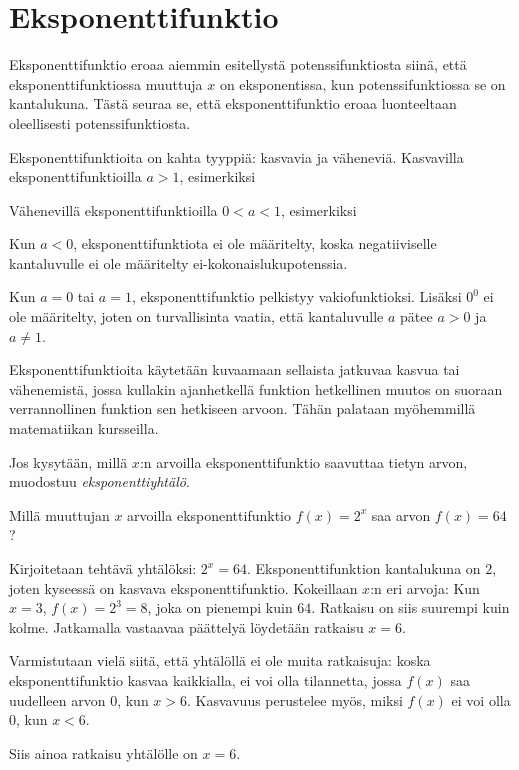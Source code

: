 \chapter{Eksponenttifunktio}


Eksponenttifunktio eroaa aiemmin esitellystä potenssifunktiosta siinä, että
eksponenttifunktiossa muuttuja $x$ on eksponentissa, kun potenssifunktiossa
se on kantalukuna. Tästä seuraa se, että eksponenttifunktio eroaa luonteeltaan
oleellisesti potenssifunktiosta.

Eksponenttifunktioita on kahta tyyppiä: kasvavia ja väheneviä.
Kasvavilla eksponenttifunktioilla $a>1$, esimerkiksi


Vähenevillä eksponenttifunktioilla $0<a<1$, esimerkiksi


Kun $a<0$, eksponenttifunktiota ei ole määritelty, koska negatiiviselle
kantaluvulle ei ole määritelty ei-kokonaislukupotenssia.

Kun $a=0$ tai $a=1$, eksponenttifunktio pelkistyy vakiofunktioksi.
Lisäksi $0^0$ ei ole määritelty, joten on turvallisinta vaatia, että
kantaluvulle $a$ pätee $a>0$ ja $a \neq 1$.

Eksponenttifunktioita käytetään kuvaamaan sellaista
jatkuvaa kasvua tai vähenemistä, jossa kullakin ajanhetkellä
funktion hetkellinen muutos on suoraan verrannollinen funktion sen
hetkiseen arvoon. Tähän palataan myöhemmillä matematiikan kursseilla.

Jos kysytään, millä $x$:n arvoilla eksponenttifunktio saavuttaa tietyn
arvon, muodostuu \emph{eksponenttiyhtälö}. 

\begin{esimerkki}
Millä muuttujan $x$ arvoilla eksponenttifunktio $f(x) = 2^x$ saa arvon
$f(x) = 64$?

Kirjoitetaan tehtävä yhtälöksi: $2^x = 64$.
Eksponenttifunktion kantalukuna on $2$, joten kyseessä on kasvava
eksponenttifunktio. Kokeillaan $x$:n eri arvoja: Kun $x = 3$,
$f(x) = 2^3 = 8$, joka on pienempi kuin $64$. Ratkaisu on siis
suurempi kuin kolme. Jatkamalla vastaavaa päättelyä löydetään ratkaisu
$x = 6$.

Varmistutaan vielä siitä, että yhtälöllä ei ole muita ratkaisuja:
koska eksponenttifunktio kasvaa kaikkialla, ei voi olla tilannetta, jossa
$f(x)$ saa uudelleen arvon $0$, kun $x > 6$. Kasvavuus perustelee
myös, miksi $f(x)$ ei voi olla $0$, kun $x < 6$.

Siis ainoa ratkaisu yhtälölle on $x = 6$.
\end{esimerkki}

